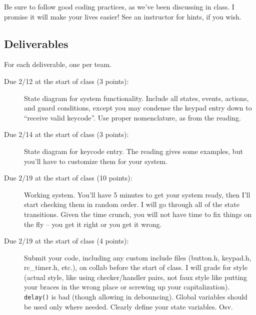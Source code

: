 \documentclass[11pt]{article} %
\begin{document}
Be sure to follow good coding practices, as we’ve been discussing in class. I promise it will make your lives easier! See an instructor for hints, if you wish.

\subsection*{Deliverables}
For each deliverable, one per team.
\begin{description}
\item[Due 2/12 at the start of class (3 points): ] State diagram for system functionality. Include all states, events, actions, and guard conditions, except you may condense the keypad entry down to “receive valid keycode”. Use proper nomenclature, as from the reading.
\item[Due 2/14 at the start of class (3 points): ] State diagram for keycode entry. The reading gives some examples, but you’ll have to customize them for your system.
\item[Due 2/19 at the start of class (10 points): ] Working system. You’ll have 5 minutes to get your system ready, then I’ll start checking them in random order. I will go through all of the state transitions. Given the time crunch, you will not have time to fix things on the fly -- you get it right or you get it wrong.
\item[Due 2/19 at the start of class (4 points): ] Submit your code, including any custom include files (button.h, keypad.h, rc\_timer.h, etc.), on collab before the start of class. I will grade for style (actual style, like using checker/handler pairs, not faux style like putting your braces in the wrong place or screwing up your capitalization). \verb|delay()| is bad (though allowing in debouncing). Global variables should be used only where needed. Clearly define your state variables. Osv.
\end{description}
\end{document}
